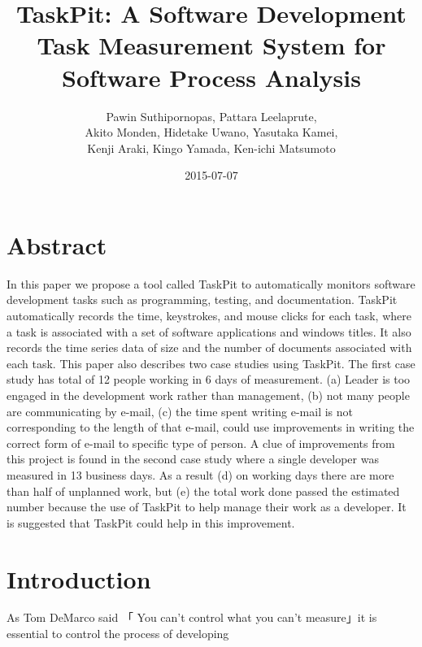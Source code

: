 \documentclass {article}
\title {TaskPit: A Software Development Task Measurement System for Software Process Analysis}
\author 	{Pawin Suthipornopas,
		Pattara Leelaprute, \\
		Akito Monden, 
		Hidetake Uwano, 
		Yasutaka Kamei, \\
		Kenji Araki, 
		Kingo Yamada, 
		Ken-ichi Matsumoto}
\date{2015-07-07}
\begin{document}
\maketitle

\section{Abstract}
	In this paper we propose a tool called TaskPit to automatically monitors software 	development tasks such as programming, testing, and documentation. TaskPit automatically records the time, keystrokes, and mouse clicks for each task, where a task is associated with a set of software applications and windows titles. It also records the time series data of size and the number of documents associated with each task. This paper also describes two case studies using TaskPit. The first case study has total of 12 people working in 6 days of measurement. (a) Leader is too engaged in the development work rather than management, (b) not many people are communicating by e-mail, (c) the time spent writing e-mail is not corresponding to the length of that e-mail, could use improvements in writing the correct form of e-mail to specific type of person. A clue of improvements from this project is found in the second case study where a single developer was measured in 13 business days. As a result (d) on working days there are more than half of unplanned work, but (e) the total work done passed the estimated number because the use of TaskPit to help manage their work as a developer. It is suggested that TaskPit could help in this improvement.
	
\section{Introduction}
	As Tom DeMarco said 「 You can't control what you can't measure」it is essential to control the process of developing \cite{demarco1986controlling} \cite{ferguson1999software}
	
	
{}


	
\end{document}
